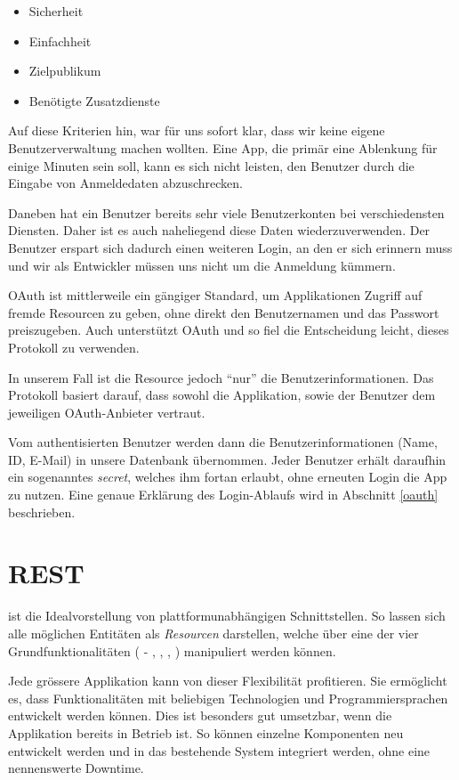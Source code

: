 \begin{itemize}
\item Sicherheit
\item Einfachheit
\item Zielpublikum
\item Benötigte Zusatzdienste
\end{itemize}

Auf diese Kriterien hin, war für uns sofort klar, dass wir keine eigene Benutzerverwaltung machen wollten.
Eine App, die primär eine Ablenkung für einige Minuten sein soll, kann es sich nicht leisten, den Benutzer durch die Eingabe von Anmeldedaten abzuschrecken.

Daneben hat ein Benutzer bereits sehr viele Benutzerkonten bei verschiedensten Diensten.
Daher ist es auch naheliegend diese Daten wiederzuverwenden.
Der Benutzer erspart sich dadurch einen weiteren Login, an den er sich erinnern muss und wir als Entwickler müssen uns nicht um die Anmeldung kümmern.

\Gls{OAuth} ist mittlerweile ein gängiger Standard, um Applikationen Zugriff auf fremde Resourcen zu geben, ohne direkt den Benutzernamen und das Passwort preiszugeben.
Auch  unterstützt \gls{OAuth} und so fiel die Entscheidung leicht, dieses Protokoll zu verwenden.

In unserem Fall ist die Resource jedoch "`nur"' die Benutzerinformationen.
Das Protokoll basiert darauf, dass sowohl die Applikation, sowie der Benutzer dem jeweiligen \gls{OAuth}-Anbieter vertraut.

Vom authentisierten Benutzer werden dann die Benutzerinformationen (Name, ID, E-Mail) in unsere Datenbank übernommen.
Jeder Benutzer erhält daraufhin ein sogenanntes \emph{secret}, welches ihm fortan erlaubt, ohne erneuten Login die App zu nutzen.
Eine genaue Erklärung des Login-Ablaufs wird in Abschnitt \ref{oauth} beschrieben.

\section{REST}
 ist die Idealvorstellung von plattformunabhängigen Schnittstellen.
So lassen sich alle möglichen Entitäten als \emph{Resourcen} darstellen, welche über eine der vier Grundfunktionalitäten ( - , , , ) manipuliert werden können.

Jede grössere Applikation kann von dieser Flexibilität profitieren.
Sie ermöglicht es, dass Funktionalitäten mit beliebigen Technologien und Programmiersprachen entwickelt werden können.
Dies ist besonders gut umsetzbar, wenn die Applikation bereits in Betrieb ist.
So können einzelne Komponenten neu entwickelt werden und in das bestehende System integriert werden, ohne eine nennenswerte Downtime.

